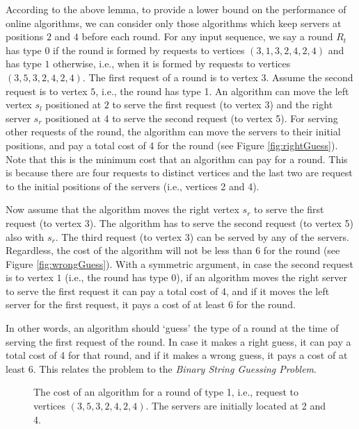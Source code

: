 According to the above lemma, to provide a lower bound on the performance of online algorithms, we can consider only those algorithms which keep servers at positions $2$ and $4$ before each round.
For any input sequence, we say a round $R_t$ has type 0 if the round is formed by requests to vertices $(3, 1, 3, 2, 4, 2, 4)$ and has type $1$ otherwise, i.e., when it is formed by requests to vertices $(3, 5, 3, 2, 4, 2, 4)$.
The first request of a round is to vertex $3$. Assume the second request is to vertex $5$, i.e., the round has type 1. An algorithm can move the left vertex $s_l$ positioned at $2$ to serve the first request (to vertex 3) and the right server $s_r$ positioned at 4 to serve the second request (to vertex 5). For serving other requests of the round, the algorithm can move the servers to their initial positions, and pay a total cost of 4 for the round (see Figure \ref{fig:rightGuess}). Note that this is the minimum cost that an algorithm can pay for a round. This is because there are four requests to distinct vertices and the last two are request to the initial positions of the servers (i.e., vertices 2 and 4).

Now assume that the algorithm moves the right vertex $s_r$ to serve the first request (to vertex 3). The algorithm has to serve the second request (to vertex 5) also with $s_r$. The third request (to vertex 3) can be served by any of the servers. Regardless, the cost of the algorithm will not be less than 6 for the round (see Figure \ref{fig:wrongGuess}). 
With a symmetric argument, in case the second request is to vertex $1$ (i.e., the round has type 0), if an algorithm moves the right server to serve the first request it can pay a total cost of 4, and if it moves the left server for the first request, it pays a cost of at least 6 for the round. 

In other words, an algorithm should `guess' the type of a round at the time of serving the first request of the round. In case it makes a right guess, it can pay a total cost of 4 for that round, and if it makes a wrong guess, it pays a cost of at least 6. This relates the problem to the \textit{Binary String Guessing Problem}. 

\begin{figure}[!t]
\centering
\hspace{.095\columnwidth}
\caption{The cost of an algorithm for a round of type 1, i.e., request to vertices $(3, 5, 3, 2, 4, 2, 4)$. The servers are initially located at 2 and 4.}
\label{packs}\end{figure}


